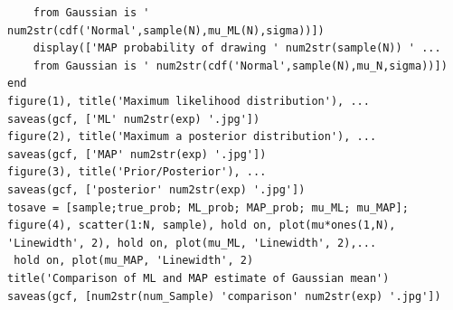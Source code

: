 \documentclass[a4paper]{article}
\begin{document}
\begin{spacing}{2.0}
\begin{itemize}
\begin{lstlisting}
    from Gaussian is ' num2str(cdf('Normal',sample(N),mu_ML(N),sigma))])
    display(['MAP probability of drawing ' num2str(sample(N)) ' ...
    from Gaussian is ' num2str(cdf('Normal',sample(N),mu_N,sigma))]) 
end
figure(1), title('Maximum likelihood distribution'), ...
saveas(gcf, ['ML' num2str(exp) '.jpg'])
figure(2), title('Maximum a posterior distribution'), ...
saveas(gcf, ['MAP' num2str(exp) '.jpg'])
figure(3), title('Prior/Posterior'), ...
saveas(gcf, ['posterior' num2str(exp) '.jpg'])
tosave = [sample;true_prob; ML_prob; MAP_prob; mu_ML; mu_MAP];
figure(4), scatter(1:N, sample), hold on, plot(mu*ones(1,N), 'Linewidth', 2), hold on, plot(mu_ML, 'Linewidth', 2),...
 hold on, plot(mu_MAP, 'Linewidth', 2)
title('Comparison of ML and MAP estimate of Gaussian mean')
saveas(gcf, [num2str(num_Sample) 'comparison' num2str(exp) '.jpg'])
\end{lstlisting}

\end{itemize}
\end{spacing}
\end{document}
